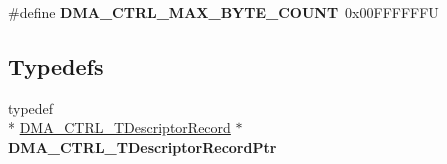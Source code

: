 \begin{DoxyCompactItemize}
\item 
\hypertarget{group___d_m_a___c_t_r_l__module_gae0cd15d6c627ebbf8b7e128430e8fbca}{\#define {\bfseries D\-M\-A\-\_\-\-C\-T\-R\-L\-\_\-\-M\-A\-X\-\_\-\-B\-Y\-T\-E\-\_\-\-C\-O\-U\-N\-T}~0x00\-F\-F\-F\-F\-F\-F\-U}\label{group___d_m_a___c_t_r_l__module_gae0cd15d6c627ebbf8b7e128430e8fbca}

\end{DoxyCompactItemize}
\subsection*{Typedefs}
\begin{DoxyCompactItemize}
\item 
\hypertarget{group___d_m_a___c_t_r_l__module_ga5439eedd7cfe5777c631cdb8d0d5ae4b}{typedef \\*
\hyperlink{struct_d_m_a___c_t_r_l___t_descriptor_record}{D\-M\-A\-\_\-\-C\-T\-R\-L\-\_\-\-T\-Descriptor\-Record} $\ast$ {\bfseries D\-M\-A\-\_\-\-C\-T\-R\-L\-\_\-\-T\-Descriptor\-Record\-Ptr}}\label{group___d_m_a___c_t_r_l__module_ga5439eedd7cfe5777c631cdb8d0d5ae4b}

\end{DoxyCompactItemize}

